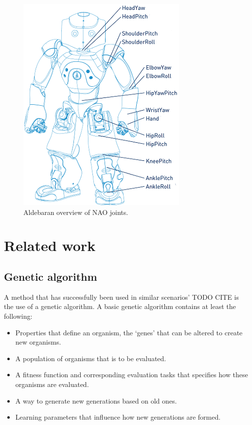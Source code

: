 \documentclass[a4paper, twocolumn]{article}
\begin{document}
\begin{figure}
	\center
	\includegraphics[scale=.85]{images/naospecsJoints}
	\caption{Aldebaran overview of NAO joints.}
	\label{fig:joints}
\end{figure}

\section{Related work}

\subsection{Genetic algorithm}
A method that has successfully been used in similar scenarios'  TODO CITE is the use of a genetic algorithm. A basic genetic algorithm contains at least the following:
\begin{itemize} 
\item Properties that define an organism, the `genes' that can be altered to create new organisms.
\item A population of organisms that is to be evaluated. 
\item A fitness function and corresponding evaluation tasks that specifies how these organisms are evaluated.
\item A way to generate new generations based on old ones. 
\item Learning parameters that influence how new generations are formed. 
\end{itemize}
\end{document}
